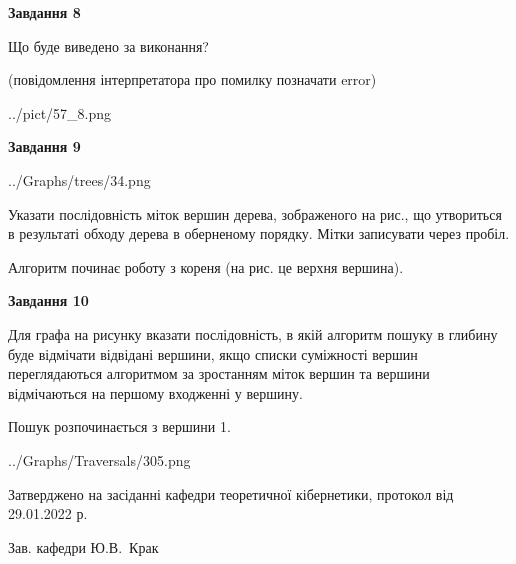 \documentclass[12pt, ukrainian]{article}
\begin{document}
{\begin {large}
{\begin {center}\textbf{Завдання 8}\end {center}}\par
Що буде виведено за виконання?\par
 (повідомлення інтерпретатора про помилку позначати error)\par
\begin{center}
	{../pict/57_8.png}
\end{center}
\newpage

{\begin {center}\textbf{Завдання 9}\end {center}}\par

\begin{center}
	{../Graphs/trees/34.png}
\end{center}
Указати послідовність міток вершин дерева, зображеного на рис., що утвориться в результаті обходу дерева в оберненому порядку. Мітки записувати через пробіл.\par Алгоритм починає роботу з кореня (на рис. це верхня вершина).\par
\newpage

{\begin {center}\textbf{Завдання 10}\end {center}}\par
Для графа на рисунку вказати послідовність, в якій алгоритм пошуку в глибину буде відмічати відвідані вершини, якщо списки суміжності вершин переглядаються алгоритмом за зростанням міток вершин та вершини відмічаються на першому вход\-женні у вершину.\par
Пошук розпочинається з вершини 1.\par

\begin{center}
	{../Graphs/Traversals/305.png}
\end{center}\par
\newpage


\end {large}
}
{\smallskip \begin {small} Затверджено на засіданні кафедри теоретичної кібернетики, протокол  від   29.01.2022 р.\par\smallskip\smallskip
{\parbox {6.5 cm}{Зав. кафедри \dotfill Ю.В.~Крак}} \end{small}}
\end{document}
